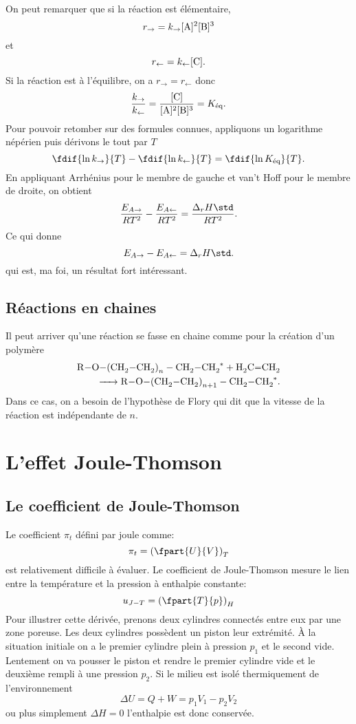 On peut remarquer que si la réaction est élémentaire,
\[ r_{\rightarrow} = k_{\rightarrow}[\ce{A}]^2[\ce{B}]^3 \]
et
\[ r_{\leftarrow} = k_{\leftarrow}[\ce{C}]. \]
Si la réaction est à l'équilibre,
on a $r_{\rightarrow} = r_{\leftarrow}$ donc
\[ \frac{k_\rightarrow}{k_\leftarrow}
  = \frac{[\ce{C}]}{[\ce{A}]^2[\ce{B}]^3} = K_{\text{éq}}. \]
Pour pouvoir retomber sur des formules connues,
appliquons un logarithme népérien puis dérivons le tout par $T$
\[ \fdif{\ln k_\rightarrow}{T} - \fdif{\ln k_\leftarrow}{T}
= \fdif{\ln K_{\text{éq}}}{T}. \]
En appliquant Arrhénius pour le membre de gauche et
van't Hoff pour le membre de droite, on obtient
\[ \frac{E_{A\rightarrow}}{RT^2} - \frac{E_{A\leftarrow}}{RT^2}
= \frac{\Delta_r H\std}{RT^2}. \]
Ce qui donne
\[ E_{A\rightarrow} - E_{A\leftarrow}
= \Delta_r H\std. \]
qui est, ma foi, un résultat fort intéressant.

\subsection{Réactions en chaines}
Il peut arriver qu'une réaction se fasse en chaine
comme pour la création d'un polymère
\begin{align*}
  \ce{R-O-(CH2-CH2)}_{n}-\ce{CH2-CH2^*} + \ce{H2C=CH2}\\
  \ce{-> R-O-(CH2-CH2)}_{n+1}-\ce{CH2-CH2^*}.
\end{align*}
Dans ce cas, on a besoin de l'hypothèse de Flory qui dit que
la vitesse de la réaction est indépendante de $n$.

\annexe

\section{L'effet Joule-Thomson}
\subsection{Le coefficient de Joule-Thomson}
Le coefficient $\pi_t$ défini par joule comme:
\[ \pi_t = \left(\fpart{U}{V}\right)_T \]
est relativement difficile à évaluer.
Le coefficient de Joule-Thomson mesure le lien entre la température et
la pression à enthalpie constante:
\[  u_{J-T} = \left(\fpart{T}{p}\right)_H \]
Pour illustrer cette dérivée, prenons deux cylindres connectés
entre eux par une zone poreuse.
Les deux cylindres possèdent un piston leur extrémité.
À la situation initiale on a le premier cylindre plein
à pression $p_1$ et le second vide.
Lentement on va pousser le piston et rendre le premier cylindre vide
et le deuxième rempli à une pression $p_2$.
Si le milieu est isolé thermiquement de l'environnement
\[ \Delta U = Q+ W = p_1V_1-p_2V_2 \]
ou plus simplement $\Delta H = 0$ l'enthalpie est donc conservée.

